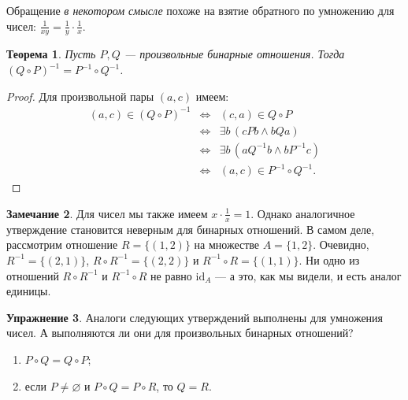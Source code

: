 \documentclass[12pt,notitlepage]{article}
\theoremstyle{plain}
\newtheorem{thm}{Теорема}[section]
\theoremstyle{definition}
\newtheorem{exc}[thm]{Упражнение}
\newtheorem{rem}[thm]{Замечание}
\theoremstyle{plain}
\newcommand{\void}{\varnothing}
\newcommand{\id}{\mathrm{id}}
\newcommand{\1}{\mathbf{1}}
\newcommand{\0}{\mathbf{0}}
\newcommand{\mcomm}[1]{}
\begin{document}
\noindent Обращение \emph{в некотором смысле} похоже на взятие обратного по умножению для чисел: $\frac{1}{xy} = \frac{1}{y} \cdot \frac{1}{x}$.

\mcomm{The Instructor might wish to compare conversion to matrix transposition or string reversion as well.}
\begin{thm}\label{ch0:comp_inv}
	Пусть $P, Q$ --- произвольные бинарные отношения. Тогда $(Q \circ P)^{-1} = P^{-1} \circ Q^{-1}$.
\end{thm}
\begin{proof}
	Для произвольной пары $(a,c)$ имеем:
	$$
	\begin{array}{rcl}
		(a, c) \in (Q \circ P)^{-1} &\iff& (c, a) \in Q \circ P\\
		&\iff&\exists b\, (cPb \wedge bQa)\\
		&\iff&\exists b\, (a Q^{-1} b \wedge b P^{-1} c)\\
		&\iff&(a, c) \in P^{-1} \circ Q^{-1}.
	\end{array}
	$$
\end{proof}
\begin{rem}
	Для чисел мы также имеем $x \cdot \frac{1}{x} = 1$. Однако аналогичное утверждение становится неверным для бинарных отношений. В самом деле, рассмотрим отношение $R = \{ (1, 2) \}$ на множестве $A = \{1, 2\}$. Очевидно, $R^{-1} = \{ (2,1) \}$, $R \circ R^{-1} = \{ (2,2)\}$ и $R^{-1} \circ R = \{ (1, 1)\}$. Ни одно из отношений $R \circ R^{-1}$ и $R^{-1} \circ R$ не равно $\id_A$ --- а это, как мы видели, и есть аналог единицы.
	
\end{rem}
\begin{exc}
	Аналоги следующих утверждений выполнены для умножения чисел. А выполняются ли они для произвольных бинарных отношений?
	\begin{enumerate}
		\item $P \circ Q = Q \circ P$;
		\item если $P \neq \void$ и $P \circ Q = P \circ R$, то $Q = R$.
	\end{enumerate}
\end{exc}
\end{document}
